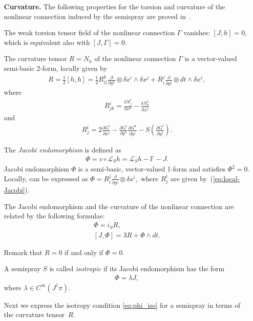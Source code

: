 \documentclass[11pt]{article}
\begin{document}
{\bf Curvature.}
The following properties for the torsion and curvature of the nonlinear
connection induced by the semispray are proved in~\cite{B-C-2010}.

The weak torsion tensor f\/ield of the nonlinear connection $\Gamma$
vanishes: $[J,h]=0,$ which is equivalent also with $[J,\Gamma]=0$.

The curvature tensor $R=N_{h}$ of the nonlinear connection $\Gamma$
is a vector-valued semi-basic 2-form, locally given by
\begin{gather}
R=\frac{1}{2}[h,h]=\frac{1}{2}R_{ij}^{k}\frac{\partial}{\partial y^{k}}\otimes\delta x^{i}\wedge\delta x^{j}+R_{i}^{j}\frac{\partial}{\partial y^{j}}\otimes dt\wedge\delta x^{i},\label{eq:19}
\end{gather}
 where \begin{gather*}
R_{jk}^{i}=\frac{\delta N_{j}^{i}}{\delta x^{k}}-\frac{\delta N_{k}^{i}}{\delta x^{j}}%
\end{gather*}
 and \begin{gather}
R_{j}^{i}=2\frac{\partial G^{i}}{\partial x^{j}}-\frac{\partial G^{i}}{\partial y^{k}}\frac{\partial G^{k}}{\partial y^{j}}-S\left(\frac{\partial G^{i}}{\partial y^{j}}\right).\label{eq:local-Jacobi}
\end{gather}


The \emph{Jacobi endomorphism} is def\/ined as \begin{gather}
\Phi=v\circ\mathcal{L}_{S}h=\mathcal{L}_{S}h-\mathbb{F}-J.\label{eq:22}\end{gather}
 Jacobi endomorphism $\Phi$ is a semi-basic, vector-valued 1-form
and satisf\/ies $\Phi^{2}=0$. Locally, can be expressed as $\Phi=R_{i}^{j}\frac{\partial}{\partial y^{j}}\otimes\delta x^{i},$
where $R_{j}^{i}$ are given by~(\ref{eq:local-Jacobi}).

The Jacobi endomorphism and the curvature of the nonlinear connection
are related by the following formulae:
\begin{gather}
\Phi   =   i_{S}R,\label{eq:23'}\\
\left[J,\Phi\right]   =   3R+\Phi\wedge dt.\label{eq:24'}
\end{gather}


Remark that $R=0$ if and only if $\Phi=0$.

\begin{definition}
A semispray $S$ is called \emph{isotropic} if its Jacobi endomorphism
has the form \begin{gather}
\Phi=\lambda J,
\label{eq:phi_iso}
\end{gather}
 where $\lambda\in C^{\infty}(J^{1}\pi)$.
\end{definition}
Next we express the isotropy condition \eqref{eq:phi_iso} for a semispray
in terms of the curvature tensor~$R$.
\end{document}
